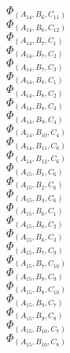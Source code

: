 \documentclass[14pt]{article}
\begin{document}
    $\Phi_{({A}_{14}, {B}_{6}, {C}_{11})}$ \\ 
    $\Phi_{({A}_{14}, {B}_{6}, {C}_{12})}$ \\ 
    $\Phi_{({A}_{14}, {B}_{7}, {C}_{1})}$ \\ 
    $\Phi_{({A}_{14}, {B}_{7}, {C}_{2})}$ \\ 
    $\Phi_{({A}_{14}, {B}_{7}, {C}_{3})}$ \\ 
    $\Phi_{({A}_{14}, {B}_{8}, {C}_{1})}$ \\ 
    $\Phi_{({A}_{14}, {B}_{8}, {C}_{2})}$ \\ 
    $\Phi_{({A}_{14}, {B}_{8}, {C}_{3})}$ \\ 
    $\Phi_{({A}_{14}, {B}_{9}, {C}_{4})}$ \\ 
    $\Phi_{({A}_{14}, {B}_{10}, {C}_{4})}$ \\ 
    $\Phi_{({A}_{14}, {B}_{11}, {C}_{6})}$ \\ 
    $\Phi_{({A}_{14}, {B}_{12}, {C}_{6})}$ \\ 
    $\Phi_{({A}_{15}, {B}_{1}, {C}_{6})}$ \\ 
    $\Phi_{({A}_{15}, {B}_{2}, {C}_{6})}$ \\ 
    $\Phi_{({A}_{15}, {B}_{3}, {C}_{6})}$ \\ 
    $\Phi_{({A}_{15}, {B}_{6}, {C}_{1})}$ \\ 
    $\Phi_{({A}_{15}, {B}_{6}, {C}_{2})}$ \\ 
    $\Phi_{({A}_{15}, {B}_{6}, {C}_{3})}$ \\ 
    $\Phi_{({A}_{15}, {B}_{7}, {C}_{9})}$ \\ 
    $\Phi_{({A}_{15}, {B}_{7}, {C}_{10})}$ \\ 
    $\Phi_{({A}_{15}, {B}_{8}, {C}_{9})}$ \\ 
    $\Phi_{({A}_{15}, {B}_{8}, {C}_{10})}$ \\ 
    $\Phi_{({A}_{15}, {B}_{9}, {C}_{7})}$ \\ 
    $\Phi_{({A}_{15}, {B}_{9}, {C}_{8})}$ \\ 
    $\Phi_{({A}_{15}, {B}_{10}, {C}_{7})}$ \\ 
    $\Phi_{({A}_{15}, {B}_{10}, {C}_{8})}$ \\ 
    
\end{document}
